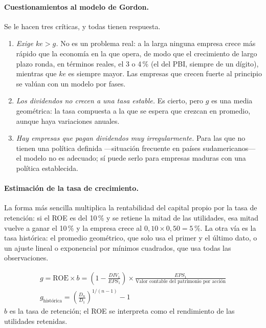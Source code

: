 \paragraph{Cuestionamientos al modelo de Gordon.} Se le hacen tres críticas, y todas tienen respuesta.
\begin{enumerate}
\item \emph{Exige $ke > g$.} No es un problema real: a la larga ninguna empresa crece más rápido que la economía en la que opera, de modo que el crecimiento de largo plazo ronda, en términos reales, el 3 o 4\,\% (el del PBI, siempre de un dígito), mientras que $ke$ es siempre mayor. Las empresas que crecen fuerte al principio se valúan con un modelo por fases.
\item \emph{Los dividendos no crecen a una tasa estable.} Es cierto, pero $g$ es una media geométrica: la tasa compuesta a la que se espera que crezcan en promedio, aunque haya variaciones anuales.
\item \emph{Hay empresas que pagan dividendos muy irregularmente.} Para las que no tienen una política definida —situación frecuente en países sudamericanos— el modelo no es adecuado; sí puede serlo para empresas maduras con una política establecida.
\end{enumerate}

\paragraph{Estimación de la tasa de crecimiento.} La forma más sencilla multiplica la rentabilidad del capital propio por la tasa de retención: si el ROE es del 10\,\% y se retiene la mitad de las utilidades, esa mitad vuelve a ganar el 10\,\% y la empresa crece al $0{,}10\times 0{,}50 = 5\,\%$. La otra vía es la tasa histórica: el promedio geométrico, que solo usa el primer y el último dato, o un ajuste lineal o exponencial por mínimos cuadrados, que usa todas las observaciones.

\begin{formulaBox}
\[
\begin{gathered}
g = \text{ROE}\times b
  = \left(1 - \frac{DIV_1}{EPS_1}\right)\times\frac{EPS_1}{\text{Valor contable del patrimonio por acción}}
\\[4pt]
g_{\text{histórica}} = \left(\frac{D_n}{D_1}\right)^{1/(n-1)} - 1
\end{gathered}
\]
$b$ es la tasa de retención; el ROE se interpreta como el rendimiento de las utilidades retenidas.
\end{formulaBox}


